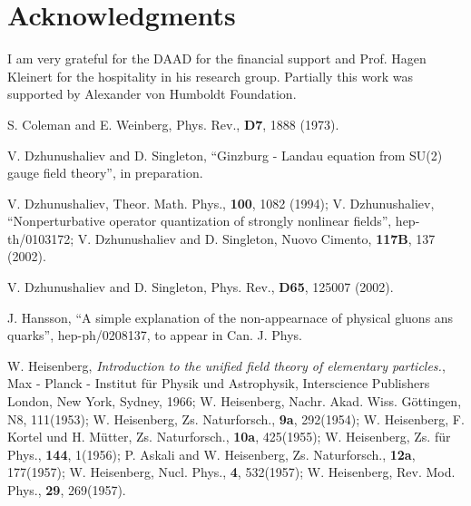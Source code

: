 \documentclass[a4paper,a4paper]{article}
\begin{document}
\section{Acknowledgments}
I am very grateful for the DAAD for the financial support and 
Prof. Hagen Kleinert for the hospitality in his research group. 
Partially this work was supported by Alexander von 
Humboldt Foundation. 

\begin{thebibliography}{99}


S. Coleman and E. Weinberg, Phys. Rev., \textbf{D7}, 1888 (1973).

V. Dzhunushaliev and D. Singleton, ``Ginzburg - Landau equation 
from SU(2) gauge field theory'', in preparation. 

V. Dzhunushaliev, Theor. Math. Phys., \textbf{100}, 1082 (1994); 
V. Dzhunushaliev, ``Nonperturbative operator 
quantization of strongly nonlinear fields'', hep-th/0103172; 
V. Dzhunushaliev and D. Singleton, Nuovo Cimento, \textbf{117B}, 
137 (2002). 

V. Dzhunushaliev and D. Singleton, Phys. Rev., \textbf{D65}, 
125007 (2002).

J. Hansson, ``A simple explanation of the non-appearnace of physical 
gluons ans quarks'', hep-ph/0208137, to appear in Can. J. Phys. 

W. Heisenberg, \textit{Introduction to the unified field theory of
elementary particles.}, Max - Planck - Institut f\"ur Physik und
Astrophysik, Interscience Publishers London, New York, Sydney,
1966; W. Heisenberg, Nachr. Akad. Wiss. G\"ottingen, N8,
111(1953); W. Heisenberg, Zs. Naturforsch., \textbf{9a},
292(1954); W. Heisenberg, F. Kortel und H. M\"utter, Zs.
Naturforsch., \textbf{10a}, 425(1955); W. Heisenberg, Zs. f\"ur
Phys., \textbf{144}, 1(1956); P. Askali and W. Heisenberg, Zs.
Naturforsch., \textbf{12a}, 177(1957); W. Heisenberg, Nucl. Phys.,
\textbf{4}, 532(1957); W. Heisenberg, Rev. Mod. Phys., \textbf{29},
269(1957).

\end{thebibliography}
\end{document}
